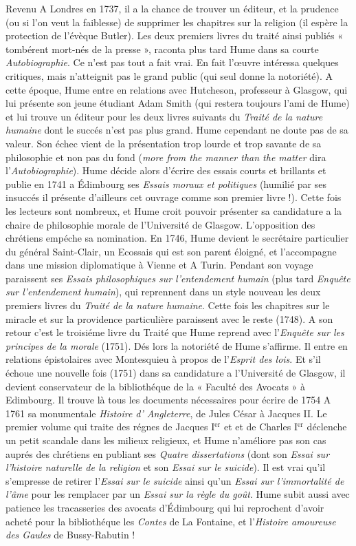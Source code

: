 Revenu A Londres en 1737, il a la chance de trouver
un éditeur, et la prudence (ou si l’on veut la faiblesse)
de supprimer les chapitres sur la religion
(il espère la protection de l’évèque Butler). Les deux
premiers livres du traité ainsi publiés « tombérent
mort-nés de la presse », raconta plus tard Hume dans
sa courte {\it Autobiographie}. Ce n’est pas tout a fait
vrai. En fait l’{\oe}uvre intéressa quelques critiques,
mais n’atteignit pas le grand public (qui seul donne
la notoriété). A cette époque, Hume entre en relations
avec Hutcheson, professeur à Glasgow, qui
lui présente son jeune étudiant Adam Smith (qui
restera toujours l’ami de Hume) et lui trouve un
éditeur pour les deux livres suivants du {\it Traité de
la nature humaine} dont le succés n’est pas plus
grand. Hume cependant ne doute pas de sa valeur.
Son échec vient de la présentation trop lourde et
trop savante de sa philosophie et non pas du fond
({\it more from the manner than the matter} dira l'{\it Autobiographie}).
Hume décide alors d’écrire des essais
courts et brillants et publie en 1741 a Édimbourg
ses {\it Essais moraux et politiques} (humilié par ses
insuccés il présente d’ailleurs cet ouvrage comme son
premier livre !). Cette fois les lecteurs sont nombreux,
et Hume croit pouvoir présenter sa candidature a
la chaire de philosophie morale de l’Université de
Glasgow. L’opposition des chrétiens empéche sa
nomination. En 1746, Hume devient le secrétaire
particulier du général Saint-Clair, un Ecossais qui
est son parent éloigné, et l’accompagne dans une
mission diplomatique à Vienne et A Turin. Pendant
son voyage paraissent ses {\it Essais philosophiques sur
l'entendement humain} (plus tard {\it Enquête sur l’entendement
humain}), qui reprennent dans un style nouveau
les deux premiers livres du {\it Traité de la nature
humaine}. Cette fois les chapitres sur le miracle et
sur la providence particulière paraissent avec le
reste (1748). A son retour c’est le troisiéme livre du
Traité que Hume reprend avec l’{\it Enquête sur les
principes de la morale} (1751). Dés lors la notoriété
de Hume s’affirme. Il entre en relations épistolaires
avec Montesquieu à propos de l’{\it Esprit des lois}.
Et s'il échoue une nouvelle fois (1751) dans sa candidature
a l’Université de Glasgow, il devient conservateur
de la bibliothéque de la « Faculté des Avocats »
à Edimbourg. Il trouve là tous les documents
nécessaires pour écrire de 1754 A 1761 sa monumentale
{\it Histoire d’ Angleterre}, de Jules César à Jacques II.
Le premier volume qui traite des régnes de Jacques
I$^\text{er}$ et et de Charles I$^\text{er}$ déclenche un petit scandale
dans les milieux religieux, et Hume n’améliore pas
son cas auprés des chrétiens en publiant ses {\it Quatre
dissertations} (dont son {\it Essai sur l'histoire naturelle
de la religion} et son {\it Essai sur le suicide}). Il est vrai
qu'il s’empresse de retirer l’{\it Essai sur le suicide}
ainsi qu’un {\it Essai sur l’immortalité de l’âme} pour les
remplacer par un {\it Essai sur la règle du goût}. Hume
subit aussi avec patience les tracasseries des avocats
d’Édimbourg qui lui reprochent d’avoir acheté
pour la bibliothéque les {\it Contes} de La Fontaine, et
l'{\it Histoire amoureuse des Gaules} de Bussy-Rabutin !

